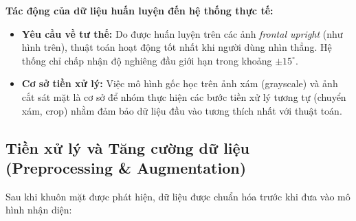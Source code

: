 \documentclass[a4paper]{book}
\begin{document}
\textbf{Tác động của dữ liệu huấn luyện đến hệ thống thực tế:}
\begin{itemize}
    \item \textbf{Yêu cầu về tư thế:} Do được huấn luyện trên các ảnh \textit{frontal upright} (như hình trên), thuật toán hoạt động tốt nhất khi người dùng nhìn thẳng. Hệ thống chỉ chấp nhận độ nghiêng đầu giới hạn trong khoảng $\pm 15^\circ$.
    \item \textbf{Cơ sở tiền xử lý:} Việc mô hình gốc học trên ảnh xám (grayscale) và ảnh cắt sát mặt là cơ sở để nhóm thực hiện các bước tiền xử lý tương tự (chuyển xám, crop) nhằm đảm bảo dữ liệu đầu vào tương thích nhất với thuật toán.
\end{itemize}

\subsection{Tiền xử lý và Tăng cường dữ liệu (Preprocessing \& Augmentation)}
Sau khi khuôn mặt được phát hiện, dữ liệu được chuẩn hóa trước khi đưa vào mô hình nhận diện:
\end{document}
